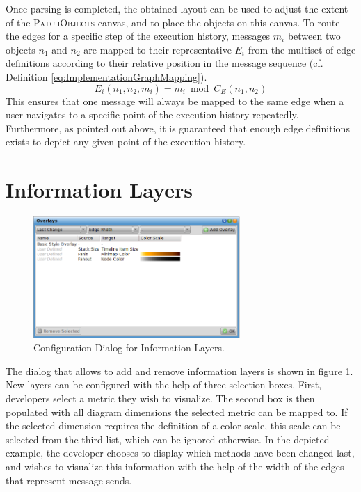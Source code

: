 Once parsing is completed, the obtained layout can be used to adjust the extent of the \textsc{PatchObjects} canvas, and to place the objects on this canvas.
To route the edges for a specific step of the execution history, messages $m_i$ between two objects $n_1$ and $n_2$ are mapped to their representative $E_i$ from the multiset of edge definitions according to their relative position in the message sequence (cf. Definition \ref{eq:ImplementationGraphMapping}).
\begin{equation}
E_i(n_1, n_2, m_i) = m_i \bmod C_E(n_1, n_2)
\label{eq:ImplementationGraphMapping}
\end{equation}
This ensures that one message will always be mapped to the same edge when a user navigates to a specific point of the execution history repeatedly.
Furthermore, as pointed out above, it is guaranteed that enough edge definitions exists to depict any given point of the execution history.

\section{Information Layers}
\label{s:ImplementationLayers}

\begin{figure}[tb]
	\centering
	\includegraphics[width=0.7\textwidth]{../images/04-ImplOverlays}
	\caption{Configuration Dialog for Information Layers.}
	\label{fig:ImplementationLayers}
\end{figure}

The dialog that allows to add and remove information layers is shown in figure \ref{fig:ImplementationLayers}.
New layers can be configured with the help of three selection boxes.
First, developers select a metric they wish to visualize.
The second box is then populated with all diagram dimensions the selected metric can be mapped to.
If the selected dimension requires the definition of a color scale, this scale can be selected from the third list, which can be ignored otherwise.
In the depicted example, the developer chooses to display which methods have been changed last, and wishes to visualize this information with the help of the width of the edges that represent message sends.

